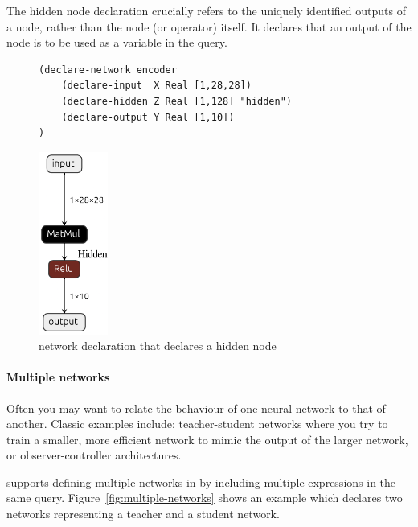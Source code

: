 The hidden node declaration crucially refers to the uniquely identified outputs of a node, rather than the node (or operator) itself. It declares that an output of the node is to be used as a variable in the \vnnlib{} query.

\begin{figure}[h!]
    \begin{minipage}[c]{0.72\textwidth}
        \begin{lstlisting}[style=lbnf]   
(declare-network encoder
    (declare-input  X Real [1,28,28])
    (declare-hidden Z Real [1,128] "hidden")
    (declare-output Y Real [1,10])
)\end{lstlisting}
    \end{minipage}%
    \begin{minipage}[c]{0.25\textwidth}
        \centering
        \includegraphics[height=6cm]{imgs/encoder_net.onnx.png}
    \end{minipage}
    \caption{\vnnlib{} network declaration that declares a hidden node}
    \label{fig:hidden-node}
\end{figure}

\paragraph{Multiple networks}

Often you may want to relate the behaviour of one neural network to that of another. Classic examples include: teacher-student networks where you try to train a smaller, more efficient network to mimic the output of the larger network, or observer-controller architectures.

\vnnlib{} supports defining multiple networks in by including multiple  expressions in the same query. Figure~\ref{fig:multiple-networks} 
shows an example which declares two networks representing a teacher and a student network.

